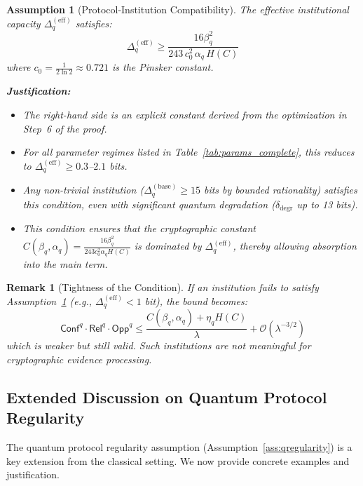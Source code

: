 \documentclass{ieeeaccess}
\newcommand{\Conf}{\mathsf{Conf}}
\newcommand{\Rel}{\mathsf{Rel}}
\newcommand{\Opp}{\mathsf{Opp}}
\newtheorem{remark}{Remark}[section]
\newtheorem{assumption}{Assumption}[section]
\begin{document}
\begin{assumption}[Protocol-Institution Compatibility]
\label{ass:compatibility}
The effective institutional capacity $\Delta_q^{\mathrm{(eff)}}$ satisfies:
\begin{equation}
    \Delta_q^{\mathrm{(eff)}} \geq \frac{16\beta_q^2}{243\, c_0^2\, \alpha_q\, H(C)}
\end{equation}
where $c_0 = \frac{1}{2\ln 2} \approx 0.721$ is the Pinsker constant.

\textbf{Justification:} 
\begin{itemize}
    \item The right-hand side is an explicit constant derived from the optimization in Step~6 of the proof.
    \item For all parameter regimes listed in Table~\ref{tab:params_complete}, this reduces to $\Delta_q^{\mathrm{(eff)}} \geq 0.3$--$2.1$ bits.
    \item Any non-trivial institution ($\Delta_q^{\mathrm{(base)}} \geq 15$ bits by bounded rationality) satisfies this condition, even with significant quantum degradation ($\delta_{\text{degr}}$ up to 13 bits).
    \item This condition ensures that the cryptographic constant $C(\beta_q,\alpha_q) = \frac{16\beta_q^2}{243 c_0^2 \alpha_q H(C)}$ is dominated by $\Delta_q^{\mathrm{(eff)}}$, thereby allowing absorption into the main term.
\end{itemize}
\end{assumption}

\begin{remark}[Tightness of the Condition]
If an institution fails to satisfy Assumption~\ref{ass:compatibility} (e.g., $\Delta_q^{\mathrm{(eff)}} < 1$ bit), the bound becomes:
\begin{equation}
    \Conf^q \cdot \Rel^q \cdot \Opp^q \leq \frac{C(\beta_q,\alpha_q) + \eta_q H(C)}{\lambda} + \mathcal{O}(\lambda^{-3/2})
\end{equation}
which is weaker but still valid. Such institutions are not meaningful for cryptographic evidence processing.
\end{remark}

\subsection{Extended Discussion on Quantum Protocol Regularity}

The quantum protocol regularity assumption (Assumption~\ref{ass:qregularity}) is a key extension from the classical setting. We now provide concrete examples and justification.
\end{document}
